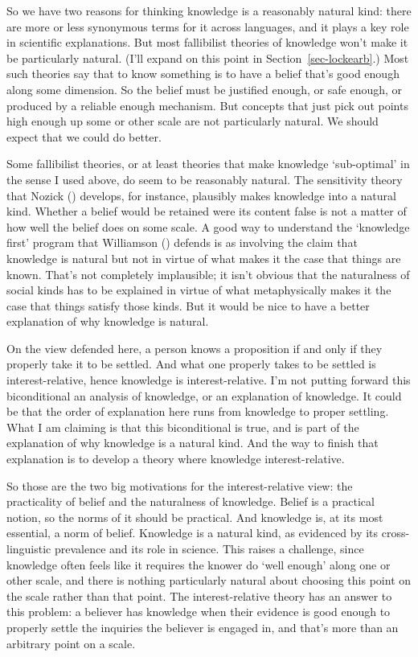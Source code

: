 \documentclass[
  12pt,
  letterpaper,
]{scrbook}
\begin{document}
So we have two reasons for thinking knowledge is a reasonably natural
kind: there are more or less synonymous terms for it across languages,
and it plays a key role in scientific explanations. But most fallibilist
theories of knowledge won't make it be particularly natural. (I'll
expand on this point in Section~\ref{sec-lockearb}.) Most such theories
say that to know something is to have a belief that's good enough along
some dimension. So the belief must be justified enough, or safe enough,
or produced by a reliable enough mechanism. But concepts that just pick
out points high enough up some or other scale are not particularly
natural. We should expect that we could do better.

Some fallibilist theories, or at least theories that make knowledge
`sub-optimal' in the sense I used above, do seem to be reasonably
natural. The sensitivity theory that Nozick
() develops, for instance, plausibly
makes knowledge into a natural kind. Whether a belief would be retained
were its content false is not a matter of how well the belief does on
some scale. A good way to understand the `knowledge first' program that
Williamson () defends is as involving
the claim that knowledge is natural but not in virtue of what makes it
the case that things are known. That's not completely implausible; it
isn't obvious that the naturalness of social kinds has to be explained
in virtue of what metaphysically makes it the case that things satisfy
those kinds. But it would be nice to have a better explanation of why
knowledge is natural.

On the view defended here, a person knows a proposition if and only if
they properly take it to be settled. And what one properly takes to be
settled is interest-relative, hence knowledge is interest-relative. I'm
not putting forward this biconditional an analysis of knowledge, or an
explanation of knowledge. It could be that the order of explanation here
runs from knowledge to proper settling. What I am claiming is that this
biconditional is true, and is part of the explanation of why knowledge
is a natural kind. And the way to finish that explanation is to develop
a theory where knowledge interest-relative.

So those are the two big motivations for the interest-relative view: the
practicality of belief and the naturalness of knowledge. Belief is a
practical notion, so the norms of it should be practical. And knowledge
is, at its most essential, a norm of belief. Knowledge is a natural
kind, as evidenced by its cross-linguistic prevalence and its role in
science. This raises a challenge, since knowledge often feels like it
requires the knower do `well enough' along one or other scale, and there
is nothing particularly natural about choosing this point on the scale
rather than that point. The interest-relative theory has an answer to
this problem: a believer has knowledge when their evidence is good
enough to properly settle the inquiries the believer is engaged in, and
that's more than an arbitrary point on a scale.
\end{document}
